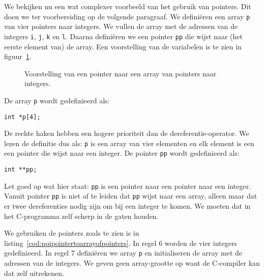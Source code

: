 We bekijken nu een wat complexer voorbeeld van het gebruik van pointers. Dit doen we ter voorbereiding op de volgende paragraaf. We definiëren een array \texttt{p} van vier pointers naar integers. We vullen de array met de adressen van de integers \texttt{i}, \texttt{j}, \texttt{k} en \texttt{l}. Daarna definiëren we een pointer \texttt{pp} die wijst naar (het eerste element van) de array. Een voorstelling van de variabelen is te zien in figuur~\ref{fig:poipointertoarrayofpointers}.

\begin{figure}[!ht]
\centering
{}
\caption{Voorstelling van een pointer naar een array van pointers naar integers.}
\label{fig:poipointertoarrayofpointers}
\end{figure}

De array \texttt{p} wordt gedefinieerd als:

\hspace*{1em}\texttt{int *p[4];}

De rechte haken hebben een hogere prioriteit dan de dereferentie-operator. We lezen de definitie dus als: \texttt{p} is een array van vier elementen en elk element is een een pointer die wijst naar een integer. De pointer \texttt{pp} wordt gedefinieerd als:

\hspace*{1em}\texttt{int **pp;}

Let goed op wat hier staat: \texttt{pp} is een pointer naar een pointer naar een integer. Vanuit pointer \texttt{pp} is niet af te leiden dat \texttt{pp} wijst naar een array, alleen maar dat er twee dereferenties nodig zijn om bij een integer te komen. We moeten dat in het C-programma zelf scherp in de gaten houden.

We gebruiken de pointers zoals te zien is in listing~\ref{cod:poipointertoarrayofpointers}. In regel 6 worden de vier integers gedefinieerd. In regel 7 definiëren we array \texttt{p} en initialiseren de array met de adressen van de integers. We geven geen array-grootte op want de C-compiler kan dat zelf uitrekenen.


